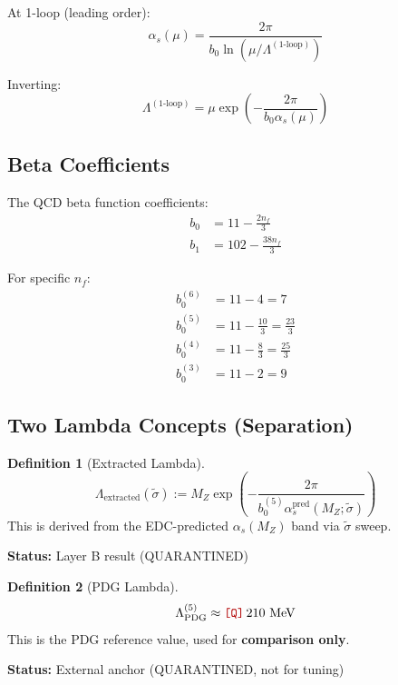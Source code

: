 \documentclass[11pt,a4paper]{article}
\newcommand{\Qnum}[1]{\textcolor{red!70!black}{\texttt{[Q]}}\,#1}
\theoremstyle{definition}
\newtheorem{definition}{Definition}[section]
\begin{document}
At 1-loop (leading order):
\begin{equation}
\label{eq:lambda-def-1loop}
\boxed{\alpha_s(\mu) = \frac{2\pi}{b_0 \ln(\mu/\Lambda^{(1\text{-loop})})}}
\end{equation}

Inverting:
\begin{equation}
\label{eq:lambda-inversion}
\boxed{\Lambda^{(1\text{-loop})} = \mu \exp\left(-\frac{2\pi}{b_0 \alpha_s(\mu)}\right)}
\end{equation}

\subsection{Beta Coefficients}
\label{subsec:beta-coeffs}

The QCD beta function coefficients:
\begin{align}
\label{eq:b0-def}
b_0 &= 11 - \frac{2n_f}{3} \\
\label{eq:b1-def}
b_1 &= 102 - \frac{38n_f}{3}
\end{align}

For specific $n_f$:
\begin{align}
\label{eq:b0-6}
b_0^{(6)} &= 11 - 4 = 7 \\
\label{eq:b0-5}
b_0^{(5)} &= 11 - \frac{10}{3} = \frac{23}{3} \\
\label{eq:b0-4}
b_0^{(4)} &= 11 - \frac{8}{3} = \frac{25}{3} \\
\label{eq:b0-3}
b_0^{(3)} &= 11 - 2 = 9
\end{align}

\subsection{Two Lambda Concepts (Separation)}
\label{subsec:lambda-separation}

\begin{definition}[Extracted Lambda]
\label{def:lambda-extracted}
\begin{equation}
\label{eq:lambda-extracted}
\Lambda_{\text{extracted}}(\tilde{\sigma}) :=
  M_Z \exp\left(-\frac{2\pi}{b_0^{(5)} \alpha_s^{\text{pred}}(M_Z; \tilde{\sigma})}\right)
\end{equation}
This is derived from the EDC-predicted $\alpha_s(M_Z)$ band via $\tilde{\sigma}$ sweep.

\textbf{Status:} Layer B result (QUARANTINED)
\end{definition}

\begin{definition}[PDG Lambda]
\label{def:lambda-pdg}
\begin{equation}
\label{eq:lambda-pdg}
\Lambda_{\text{PDG}}^{(5)} \approx \Qnum{210} \text{ MeV}
\end{equation}
This is the PDG reference value, used for \textbf{comparison only}.

\textbf{Status:} External anchor (QUARANTINED, not for tuning)
\end{definition}
\end{document}
